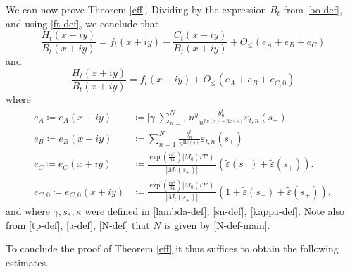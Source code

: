 \documentclass[a4paper,11pt,twoside]{amsart}
\newcommand\eps{\varepsilon}
\begin{document}
We can now prove Theorem \ref{eff}.  Dividing by the expression $B_t$ from \eqref{bo-def}, and using \eqref{ft-def}, we conclude that
\begin{equation}\label{ratio-form-refined}
\frac{H_t(x+iy)}{B_t(x+iy)} = f_t(x+iy) - \frac{C_t(x+iy)}{B_t(x+iy)} + O_{\leq}\left( e_A + e_B + e_{C} \right)
\end{equation}
and
\begin{equation}\label{ratio-form}
\frac{H_t(x+iy)}{B_t(x+iy)} = f_t(x+iy) + O_{\leq}\left( e_A + e_B + e_{C,0} \right)
\end{equation}
where
\begin{align}
e_A \coloneqq e_A(x+iy) &\coloneqq |\gamma| \sum_{n=1}^N n^y \frac{b_n^t}{n^{\mathrm{Re}(s) + \mathrm{Re}(\kappa)}} \eps_{t,n}(s_-) \label{ea-def}\\
e_B \coloneqq e_B(x+iy) &\coloneqq \sum_{n=1}^N  \frac{b_n^t}{n^{\mathrm{Re}(s)}} \eps_{t,n}(s_+) \label{eb-def} \\
e_{C} \coloneqq e_{C}(x+iy) &\coloneqq \frac{\exp\left( \frac{t \pi^2}{64}\right) |M_0(iT')|}{|M_t(s_+)|} \left(\tilde \eps(s_-) + \tilde \eps(s_+)\right).\label{ecc-def}\\
e_{C,0} \coloneqq e_{C,0}(x+iy) &\coloneqq \frac{\exp\left( \frac{t \pi^2}{64}\right) |M_0(iT')|}{|M_t(s_+)|} \left(1 + \tilde \eps(s_-) + \tilde \eps(s_+) \right),\label{ec-def}
\end{align}
and where $\gamma,s_*,\kappa$ were defined in \eqref{lambda-def}, \eqref{sn-def}, \eqref{kappa-def}.  Note also from \eqref{tp-def}, \eqref{a-def}, \eqref{N-def} that $N$ is given by \eqref{N-def-main}.

To conclude the proof of Theorem \ref{eff} it thus suffices to obtain the following estimates.
\end{document}
